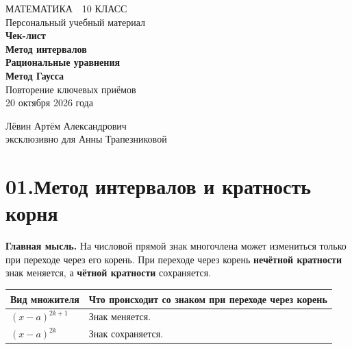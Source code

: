 \documentclass[a4paper,12pt]{article}
\newcommand{\strong}[1]{{\color{darkaccent}\textbf{#1}}}
\begin{document}
\thispagestyle{empty}
\vspace*{32mm}
\begin{center}
{\color{accent}\large МАТЕМАТИКА \,\textbullet\, 10 КЛАСС}\\[14mm]
{\color{softgray}\large Персональный учебный материал}\\[8mm]
{\Huge\bfseries Чек-лист}\\[9mm]
{\LARGE\bfseries\color{darkaccent} Метод интервалов\\[2mm]
Рациональные уравнения\\[2mm] Метод Гаусса}\\[17mm]
{\large Повторение ключевых приёмов}\\[18mm]
{\color{textgray}\large 20 октября 2026 года}
\end{center}
\vfill
\begin{center}
{\color{darkaccent}\large Лёвин Артём Александрович}\\[2mm]
{\large эксклюзивно для Анны Трапезниковой}
\end{center}
\vspace{14mm}
\clearpage

\section*{\color{darkaccent}01.\quad Метод интервалов и кратность корня}
\strong{Главная мысль.} На числовой прямой знак многочлена может
измениться только при переходе через его корень. При переходе через корень
\textbf{нечётной кратности} знак меняется, а \textbf{чётной кратности}
сохраняется.

\begin{center}
\begin{tabularx}{\linewidth}{@{}p{46mm}X@{}}
\toprule
Вид множителя & Что происходит со знаком при переходе через корень\\
\midrule
$(x-a)^{2k+1}$ & Знак меняется.\\
$(x-a)^{2k}$ & Знак сохраняется.\\
\bottomrule
\end{tabularx}
\end{center}
\end{document}
